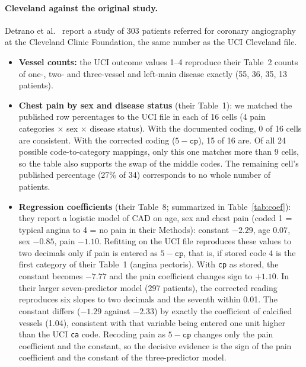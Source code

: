 \documentclass[11pt]{article}
\begin{document}
\paragraph{Cleveland against the original study.}
Detrano et al.~\cite{detrano1986} report a study of 303 patients referred for coronary angiography at the Cleveland Clinic Foundation, the same number as the UCI Cleveland file.
\begin{itemize}
\item \textbf{Vessel counts:} the UCI outcome values 1--4 reproduce their Table~2 counts of one-, two- and three-vessel and left-main disease exactly (55, 36, 35, 13 patients).
\item \textbf{Chest pain by sex and disease status} (their Table~1): we matched the published row percentages to the UCI file in each of 16 cells (4 pain categories $\times$ sex $\times$ disease status). With the documented coding, 0 of 16 cells are consistent. With the corrected coding ($5-\texttt{cp}$), 15 of 16 are. Of all 24 possible code-to-category mappings, only this one matches more than 9 cells, so the table also supports the swap of the middle codes. The remaining cell's published percentage (27\% of 34) corresponds to no whole number of patients.
\item \textbf{Regression coefficients} (their Table~8; summarized in Table~\ref{tab:coef}): they report a logistic model of CAD on age, sex and chest pain (coded 1 = typical angina to 4 = no pain in their Methods): constant $-2.29$, age $0.07$, sex $-0.85$, pain $-1.10$. Refitting on the UCI file reproduces these values to two decimals only if pain is entered as $5-\texttt{cp}$, that is, if stored code 4 is the first category of their Table~1 (angina pectoris). With \texttt{cp} as stored, the constant becomes $-7.77$ and the pain coefficient changes sign to $+1.10$. In their larger seven-predictor model (297 patients), the corrected reading reproduces six slopes to two decimals and the seventh within 0.01. The constant differs ($-1.29$ against $-2.33$) by exactly the coefficient of calcified vessels (1.04), consistent with that variable being entered one unit higher than the UCI \texttt{ca} code. Recoding pain as $5-\texttt{cp}$ changes only the pain coefficient and the constant, so the decisive evidence is the sign of the pain coefficient and the constant of the three-predictor model.
\end{itemize}
\end{document}
